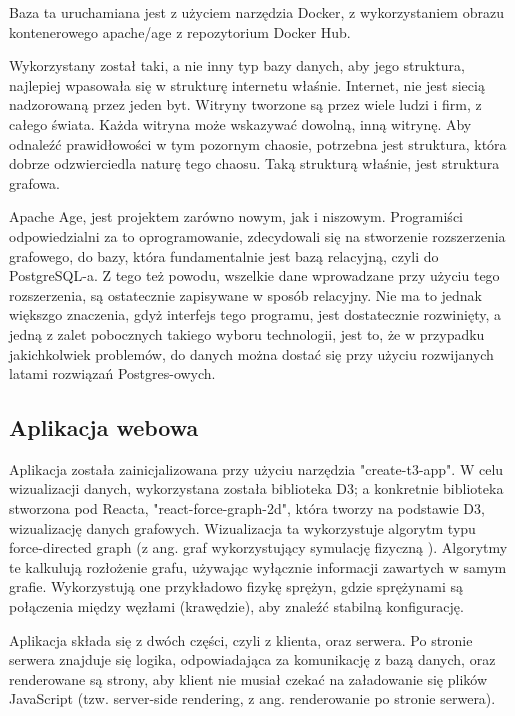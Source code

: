 \documentclass[a4paper, 12pt]{article}
\begin{document}
Baza ta uruchamiana jest z użyciem narzędzia Docker, z wykorzystaniem obrazu kontenerowego apache/age z repozytorium Docker Hub.

Wykorzystany został taki, a nie inny typ bazy danych, aby jego struktura, najlepiej wpasowała się w strukturę internetu właśnie. Internet, nie jest siecią nadzorowaną przez jeden byt. Witryny tworzone są przez wiele ludzi i firm, z całego świata. Każda witryna może wskazywać dowolną, inną witrynę. Aby odnaleźć prawidłowości w tym pozornym chaosie, potrzebna jest struktura, która dobrze odzwierciedla naturę tego chaosu. Taką strukturą właśnie, jest struktura grafowa.

Apache Age, jest projektem zarówno nowym, jak i niszowym. Programiści odpowiedzialni za to oprogramowanie, zdecydowali się na stworzenie rozszerzenia grafowego, do bazy, która fundamentalnie jest bazą relacyjną, czyli do PostgreSQL-a. Z tego też powodu, wszelkie dane wprowadzane przy użyciu tego rozszerzenia, są ostatecznie zapisywane w sposób relacyjny. Nie ma to jednak większgo znaczenia, gdyż interfejs tego programu, jest dostatecznie rozwinięty, a jedną z zalet pobocznych takiego wyboru technologii, jest to, że w przypadku jakichkolwiek problemów, do danych można dostać się przy użyciu rozwijanych latami rozwiązań Postgres-owych.

\subsection{Aplikacja webowa}
Aplikacja została zainicjalizowana przy użyciu narzędzia "create-t3-app". W celu wizualizacji danych, wykorzystana została biblioteka D3; a konkretnie biblioteka stworzona pod Reacta, "react-force-graph-2d", która tworzy na podstawie D3, wizualizację danych grafowych.\cite{reactForceGraph} Wizualizacja ta wykorzystuje algorytm typu force-directed graph (z ang. graf wykorzystujący symulację fizyczną \cite{zaryjewskiForceDirectedGraph}). Algorytmy te kalkulują rozłożenie grafu, używając wyłącznie informacji zawartych w samym grafie. Wykorzystują one przykładowo fizykę sprężyn, gdzie sprężynami są połączenia między węzłami (krawędzie), aby znaleźć stabilną konfigurację.\cite{kobourovSpringEmbeddersForce}

Aplikacja składa się z dwóch części, czyli z klienta, oraz serwera. Po stronie serwera znajduje się logika, odpowiadająca za komunikację z bazą danych, oraz renderowane są strony, aby klient nie musiał czekać na załadowanie się plików JavaScript (tzw. server-side rendering, z ang. renderowanie po stronie serwera).\cite{cloudinaryServerSideRendering}
\end{document}
